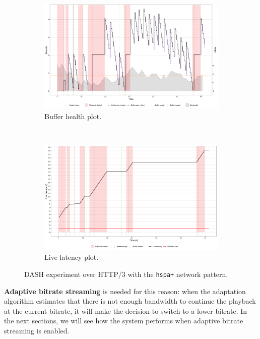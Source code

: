 \begin{figure}[h]
	\centering
	
	\begin{subfigure}[t]{0.5\textwidth}
		\centering
		\includegraphics[width=\textwidth]{res/eval_nonabr_hspa+_h3.png}
		\caption{Buffer health plot.}
		\label{fig:eval_nonabr_hspa+_h3_buffer}
	\end{subfigure}%
	~ 
	\begin{subfigure}[t]{0.5\textwidth}
		\centering
		\includegraphics[width=\textwidth]{res/eval_nonabr_hspa+_h3_latency.png}
		\caption{Live latency plot.}
		\label{fig:eval_nonabr_hspa+_h3_waterfall}
	\end{subfigure}
	
	\caption{DASH experiment over HTTP/3 with the \texttt{hspa+} network pattern.}
	\label{fig:eval_nonabr_hspa+_h3}
\end{figure}

\textbf{Adaptive bitrate streaming} is needed for this reason: when the adaptation algorithm estimates that there is not enough bandwidth to continue the playback at the current bitrate, it will make the decision to switch to a lower bitrate. In the next sections, we will see how the system performs when adaptive bitrate streaming is enabled.

